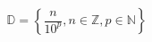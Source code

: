 \documentclass[preview]{standalone}
\begin{document}
\begin{align*}
\mathbb{D} = \left \{ \dfrac{n}{10^p},n\in\mathbb{Z},p\in\mathbb{N} \right \}
\end{align*}
\end{document}
